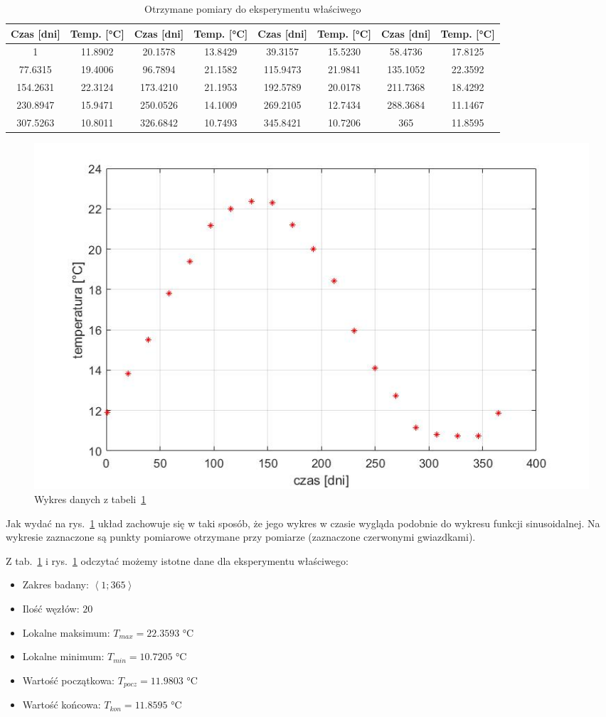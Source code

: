 \documentclass[a4paper, 12pt]{mwart}
\begin{document}
			\begin{table}[h]
				\center
				\begin{tabular}{|c|c||c|c||c|c||c|c|}
					\hline
					Czas [dni] & Temp. [°C] & Czas [dni] & Temp. [°C] & Czas [dni] & Temp. [°C] & Czas [dni] & Temp. [°C]\\ \hline \hline
					1        & 11.8902  & 20.1578  & 13.8429  &  39.3157 & 15.5230 & 58.4736  & 17.8125 \\ \hline
					77.6315  & 19.4006  & 96.7894  & 21.1582  & 115.9473 & 21.9841 & 135.1052 & 22.3592 \\ \hline 
					154.2631 & 22.3124  & 173.4210 & 21.1953  & 192.5789 & 20.0178 & 211.7368 & 18.4292 \\ \hline 
					230.8947 & 15.9471  & 250.0526 & 14.1009  & 269.2105 & 12.7434 & 288.3684 & 11.1467 \\ \hline 
					307.5263 & 10.8011  & 326.6842 & 10.7493  & 345.8421 & 10.7206 & 365      & 11.8595 \\ \hline
				\end{tabular}
				\caption{Otrzymane pomiary do eksperymentu właściwego}
				\label{tab:main}
			\end{table}

			\begin{figure}[h]
				\begin{center}
					\includegraphics[width = 0.7\linewidth]{graphs/1A.jpg}
					\caption{Wykres danych z tabeli~\ref{tab:main}}
					\label{fig:1A}
				\end{center}
			\end{figure}

			Jak wydać na rys.~\ref{fig:1A} układ zachowuje się w taki sposób, że jego wykres w czasie wygląda 
			podobnie do wykresu funkcji sinusoidalnej. Na wykresie zaznaczone są punkty pomiarowe otrzymane 
			przy pomiarze (zaznaczone czerwonymi gwiazdkami).

			Z tab.~\ref{tab:main} i rys.~\ref{fig:1A} odczytać możemy istotne dane dla eksperymentu właściwego:
			\begin{itemize}
				\item Zakres badany: $\left< 1;365 \right>$
				\item Ilość węzłów: $20$
				\item Lokalne maksimum: $T_{max} = 22.3593 \text{ °C}$
				\item Lokalne minimum: $T_{min} = 10.7205 \text{ °C}$
				\item Wartość początkowa: $ T_{pocz} = 11.9803 \text{ °C}$
				\item Wartość końcowa: $ T_{kon} = 11.8595 \text{ °C}$ 
			\end{itemize}
\end{document}
